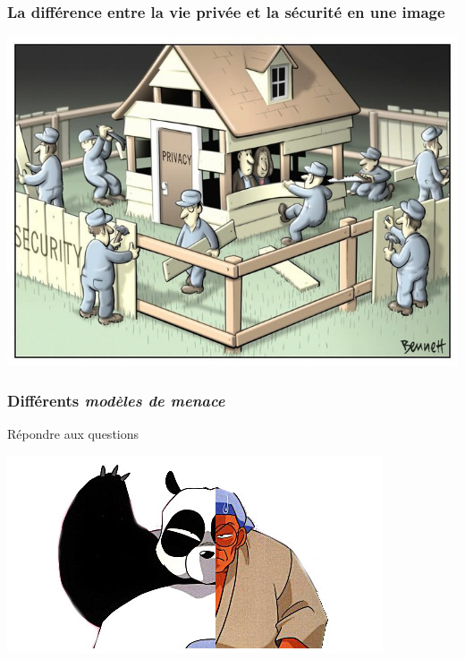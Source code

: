 \documentclass{beamer}
\begin{document}
\begin{frame}
\frametitle{La différence entre la vie privée et la sécurité en une image}
\begin{center}
\includegraphics[scale=0.4]{./images/Security_Privacy.jpg}
\end{center}
\end{frame}

\begin{frame}
\frametitle{Différents \emph{modèles de menace}}
\begin{block}{Répondre aux questions}
\end{block}

\begin{center}
\includegraphics[scale=0.4]{./images/bannierepseudonymat.jpg}
\end{center}


\end{frame}
\end{document}
